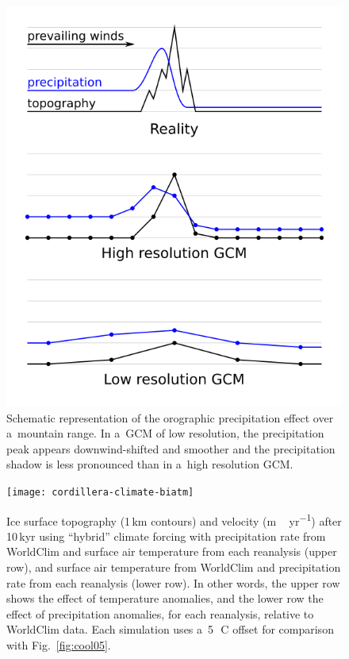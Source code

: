 \documentclass[tc, ms]{copernicus}
\begin{document}
\begin{figure}
  \includegraphics{cordillera-climate-oroprecip}
  \caption{Schematic representation of the orographic precipitation effect over a~mountain range. In a~GCM of low resolution, the precipitation peak appears downwind-shifted and smoother and the precipitation shadow is less pronounced than in a~high resolution GCM.}
  \label{fig:oroprecip}
\end{figure}

\begin{figure}
  \texttt{[image: cordillera-climate-biatm]}
  \caption{Ice surface topography (1\,\unit{km} contours) and velocity (\unit{m\,yr^{-1}}) after 10\,kyr using ``hybrid'' climate forcing with precipitation rate from WorldClim and surface air temperature from each reanalysis (upper row), and surface air temperature from WorldClim and precipitation rate from each reanalysis (lower row). In other words, the upper row shows the effect of temperature anomalies, and the lower row the effect of precipitation anomalies, for each reanalysis, relative to WorldClim data. Each simulation uses a~5\,\unit{{\degree}C} offset for comparison with Fig.~\ref{fig:cool05}.}
  \label{fig:biatm}
\end{figure}
\end{document}
